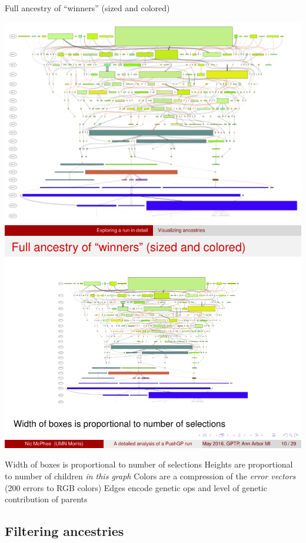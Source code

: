 \documentclass{beamer}
\begin{document}
\begin{frame}{Full ancestry of ``winners'' (sized and colored)}
		\begin{overprint}
		 			\centering
		\includegraphics[width=0.7\linewidth]{../../figures/run0_RBM_color_full_30000}
		\onslide<4> 			\centering
		\includegraphics[width=0.9\linewidth]{../../figures/run0_colored_detail}
		\end{overprint}
	\begin{overprint}
		\onslide<1>
		Width of boxes is proportional to number of selections
		\onslide<2>
		Heights are proportional to number of children \emph{in this graph}
		\onslide<3>
		Colors are a compression of the \emph{error vectors} (200 errors to RGB colors)
		\onslide<4>
		Edges encode genetic ops and level of genetic contribution of parents
	\end{overprint}
\end{frame}

\subsection{Filtering ancestries}
\end{document}
